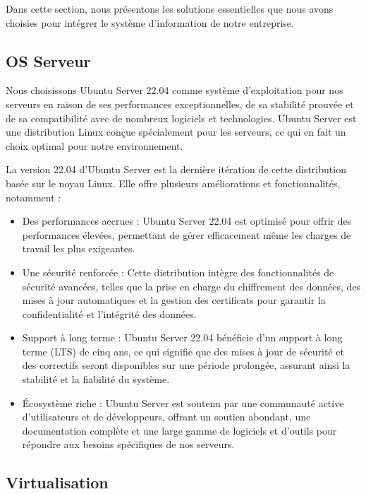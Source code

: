 Dans cette section, nous présentons les solutions essentielles que nous avons choisies pour intégrer le système d’information de notre entreprise.

\subsection{OS Serveur}

Nous choisissons Ubuntu Server 22.04 comme système d'exploitation pour nos serveurs en raison de ses performances exceptionnelles, de sa stabilité prouvée et de sa compatibilité avec de nombreux logiciels et technologies. Ubuntu Server est une distribution Linux conçue spécialement pour les serveurs, ce qui en fait un choix optimal pour notre environnement.

La version 22.04 d'Ubuntu Server est la dernière itération de cette distribution basée sur le noyau Linux. Elle offre plusieurs améliorations et fonctionnalités, notamment :

\begin{itemize}


\item Des performances accrues : Ubuntu Server 22.04 est optimisé pour offrir des performances élevées, permettant de gérer efficacement même les charges de travail les plus exigeantes.

\item Une sécurité renforcée : Cette distribution intègre des fonctionnalités de sécurité avancées, telles que la prise en charge du chiffrement des données, des mises à jour automatiques et la gestion des certificats pour garantir la confidentialité et l'intégrité des données.

\item Support à long terme : Ubuntu Server 22.04 bénéficie d'un support à long terme (LTS) de cinq ans, ce qui signifie que des mises à jour de sécurité et des correctifs seront disponibles sur une période prolongée, assurant ainsi la stabilité et la fiabilité du système.

\item Écosystème riche : Ubuntu Server est soutenu par une communauté active d'utilisateurs et de développeurs, offrant un soutien abondant, une documentation complète et une large gamme de logiciels et d'outils pour répondre aux besoins spécifiques de nos serveurs.


\end{itemize}

\subsection{Virtualisation}


